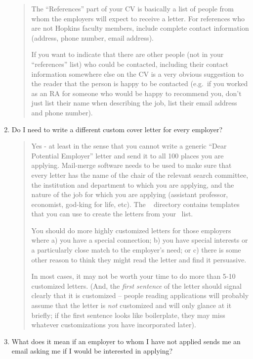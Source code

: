 \documentclass{\classes/econtex}
\providecommand\phantomsection{}
\begin{document}
\begin{enumerate}
  \begin{quote}
    The ``References'' part of your CV is basically a list of people from
    whom the employers will expect to receive a letter.  For references who
    are not Hopkins faculty members, include complete contact information
    (address, phone number, email address).

    If you want to indicate that there are other people (not in your
    ``references'' list) who could be contacted, including their contact
    information somewhere else on the CV is a very obvious suggestion to
    the reader that the person is happy to be contacted (e.g.\ if you
    worked as an RA for someone who would be happy to recommend you,
    don't just list their name when describing the job, list their email
    address and phone number).


  \end{quote}
\item  Do I need to write a different custom cover letter for every employer?
  
  \begin{quote}
    Yes - at least in the sense that you cannot write a generic ``Dear Potential Employer'' letter
    and send it to all 100 places you are applying.  Mail-merge software needs to be used to make sure
    that every letter has the name of the chair of the relevant search
    committee, the institution and department to which you are applying,
    and the nature of the job for which you are applying (assistant
    professor, economist, god-king for life, etc).  The \Templates~ directory contains templates that 
    you can use to create the letters from your \EMtt~list.  
    
    You should do more highly customized letters for those employers
    where a) you have a special connection; b) you have special
    interests or a particularly close match to the employer's need; or
    c) there is some other reason to think they might read the letter
    and find it persuasive.  

    In most cases, it may not be worth your time to do more than
    5-10 customized letters.  (And, the \textit{first sentence} of the letter should signal
    clearly that it is customized -- people reading applications will probably assume that the letter is \textit{not} customized and will only glance at it briefly; if the first sentence looks like boilerplate, they may miss whatever customizations you have incorporated later).

    \ifdvi\phantomsection\hypertarget{WhatIfEmployerContactsStudent}{}\fi
  \end{quote}
\item  What does it mean if an employer to whom I have not applied sends me an email asking me if I would be interested in applying?


\end{enumerate}
\end{document}
